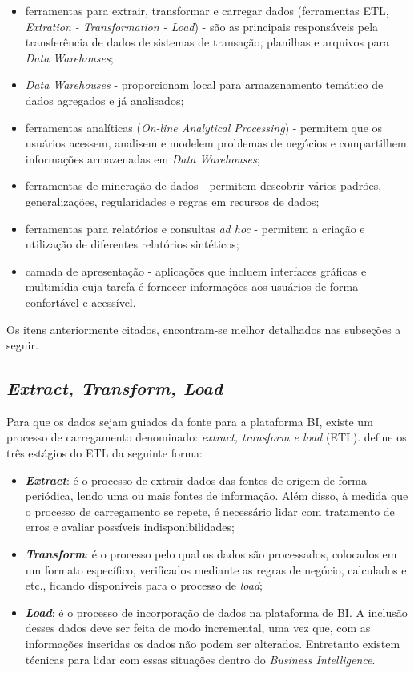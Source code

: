 \begin{itemize}
     \item ferramentas para extrair, transformar e carregar dados (ferramentas ETL, \textit{Extration - Transformation - Load}) - são as principais responsáveis pela transferência de dados de sistemas de transação, planilhas e arquivos para \textit{Data Warehouses};
     \item \textit{Data Warehouses} - proporcionam local para armazenamento temático de dados agregados e já analisados;
     \item ferramentas analíticas (\textit{On-line Analytical Processing}) - permitem que os usuários acessem, analisem e modelem problemas de negócios e compartilhem informações armazenadas em \textit{Data Warehouses};
     \item ferramentas de mineração de dados - permitem descobrir vários padrões, generalizações, regularidades e regras em recursos de dados;
     \item ferramentas para relatórios e consultas \textit{ad hoc} - permitem a criação e utilização de diferentes relatórios sintéticos;
     \item camada de apresentação - aplicações que incluem interfaces gráficas e multimídia cuja tarefa é fornecer informações aos usuários de forma confortável e acessível.
\end{itemize}

Os itens anteriormente citados, encontram-se melhor detalhados nas subseções a seguir.

\subsection{\textit{Extract, Transform, Load}} \label{subD-etl}

Para que os dados sejam guiados da fonte para a plataforma BI, existe um processo de carregamento denominado: \textit{extract, transform e load} (ETL).  define os três estágios do ETL da seguinte forma:
\begin{itemize}
    \item \textbf{\textit{Extract}}: é o processo de extrair dados das fontes de origem de forma periódica, lendo uma ou mais fontes de informação. Além disso, à medida que o processo de carregamento se repete, é necessário lidar com tratamento de erros e avaliar possíveis indisponibilidades;
    \item \textbf{\textit{Transform}}: é o processo pelo qual os dados são processados, colocados em um formato específico, verificados mediante as regras de negócio, calculados e etc., ficando disponíveis para o processo de \textit{load};
    \item \textbf{\textit{Load}}: é o processo de incorporação de dados na plataforma de BI. A inclusão desses dados deve ser feita de modo incremental, uma vez que, com as informações inseridas os dados não podem ser alterados. Entretanto existem técnicas para lidar com essas situações dentro do \textit{Business Intelligence}.
\end{itemize}
